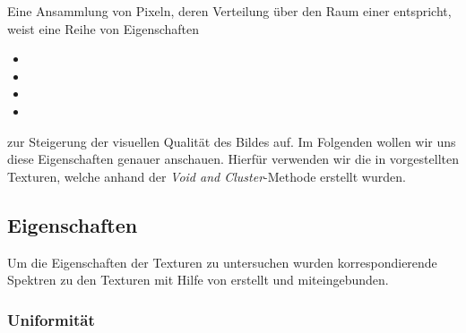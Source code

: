 Eine Ansammlung von Pixeln, deren Verteilung über den Raum einer  entspricht, 
weist eine Reihe von Eigenschaften

\begin{itemize}

    \item {}
    \item {}
    \item {}
    \item {}

\end{itemize}

zur Steigerung der visuellen Qualität des Bildes auf. \cite{3288}
Im Folgenden wollen wir uns diese Eigenschaften genauer anschauen.
Hierfür verwenden wir die in \cite{Pet17} vorgestellten Texturen, welche anhand der
\textit{Void and Cluster}-Methode\cite{ulichney1993void} erstellt wurden.


\subsection{Eigenschaften}

Um die Eigenschaften der Texturen zu untersuchen wurden korrespondierende Spektren zu den Texturen mit Hilfe von 
\cite{JCrystalSoft2018} erstellt und miteingebunden.

\subsubsection{Uniformität}
\label{ch:Content1:sec:blue noise:Uniformität}


